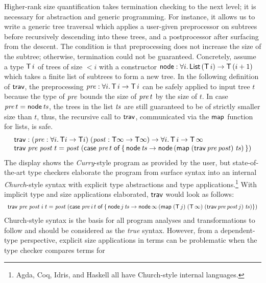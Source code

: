 \documentclass[acmlarge,review,anonymous]{acmart}\settopmatter{printfolios=true}
\begin{document}
Higher-rank size quantification takes termination checking to the next
level; it is necessary for abstraction and generic programming.  For
instance, it allows us to write a generic tree traversal which applies
a user-given preprocessor on subtrees before recursively descending
into these trees, and a postprocessor after surfacing from the
descent.
The condition is that preprocessing does not increase the size of the subtree; otherwise, termination could not be guaranteed.  Concretely, assume a type $\mathsf{T}\,i$ of trees of size $< i$ with a constructor $\mathsf{node} : \forall i.\, \mathsf{List}\,(\mathsf{T}\,i) \to \mathsf{T}\,(i+1)$ which takes a finite list of subtrees to form a new tree.
In the following definition of $\mathsf{trav}$, the preprocessing $\mathit{pre} : \forall i.\, \mathsf{T}\,i \to \mathsf{T}\,i$ can be safely applied to input tree $t$ because the type of $\mathit{pre}$ bounds the size of $\mathit{pre}\,t$ by the size of $t$.
In case $\mathit{pre}\,t = \mathsf{node}\,\mathit{ts}$, the trees in the list $\mathit{ts}$ are still guaranteed to be of strictly smaller size than $t$, thus, the recursive call to $\mathsf{trav}$, communicated via the $\mathsf{map}$ function for lists, is safe.
\[
\begin{array}{l}
  \mathsf{trav} : (\mathit{pre} : \forall i.\, \mathsf{T} i \to \mathsf{T} i)\; (\mathit{post} : \mathsf{T} \infty \to \mathsf{T} \infty) \to \forall i.\, \mathsf{T}\,i \to \mathsf{T}\,\infty
  \\
  \mathsf{trav} \; \mathit{pre} \; \mathit{post} \; t = \mathit{post}\;(\mathsf{case}\;\mathit{pre}\,t\;\mathsf{of} \, \{ \, \mathsf{node}\,\mathit{ts} \to \mathsf{node}\,(\mathsf{map} \; (\mathsf{trav} \, \mathit{pre} \, \mathit{post}) \; \mathit{ts})\, \})
\end{array}
\]
The display shows the \emph{Curry}-style program as provided by the user, but state-of-the-art type checkers elaborate the program from surface syntax into an internal \emph{Church}-style syntax with explicit type abstractions and type applications.\footnote{Agda, Coq, Idris, and Haskell \cite{sulzmannChakravartyPeythonJonesDonnelly:tldi07} all have Church-style internal languages.}  With implicit type and size applications elaborated, $\mathsf{trav}$ would look as follows:
\[
\begin{array}{l}
  \mathsf{trav} \; \mathit{pre} \; \mathit{post} \; i\; t = \mathit{post}\;(\mathsf{case}\;\mathit{pre}\,i\,t\;\mathsf{of} \, \{ \, \mathsf{node}\,j\,\mathit{ts} \to \mathsf{node}\,\infty\,(\mathsf{map} \; (\mathsf{T}\,j) \; (\mathsf{T}\,\infty) \; (\mathsf{trav} \, \mathit{pre} \, \mathit{post} \, j) \; \mathit{ts}) \})
\end{array}
\]
Church-style syntax is the basis for all program analyses and transformations to follow and should be considered as the \emph{true} syntax.
However, from a dependent-type perspective, explicit size applications
in terms can be problematic when the type checker compares terms for
\end{document}
